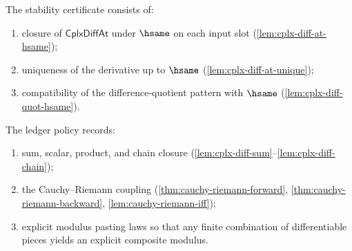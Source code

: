 \begin{definition}
\label{def:cplx-diff-stability-certificate}
The stability certificate consists of:
\begin{enumerate}
  \item closure of \(\mathsf{CplxDiffAt}\) under \(\hsame\) on each input slot (\autoref{lem:cplx-diff-at-hsame});
  \item uniqueness of the derivative up to \(\hsame\) (\autoref{lem:cplx-diff-at-unique});
  \item compatibility of the difference-quotient pattern with \(\hsame\) (\autoref{lem:cplx-diff-quot-hsame}).
\end{enumerate}
\end{definition}

\begin{definition}
\label{def:cplx-diff-ledger-policy}
The ledger policy records:
\begin{enumerate}
  \item sum, scalar, product, and chain closure (\autoref{lem:cplx-diff-sum}--\autoref{lem:cplx-diff-chain});
  \item the Cauchy--Riemann coupling (\autoref{thm:cauchy-riemann-forward}, \autoref{thm:cauchy-riemann-backward}, \autoref{lem:cauchy-riemann-iff});
  \item explicit modulus pasting laws so that any finite combination of differentiable pieces yields an explicit composite modulus.
\end{enumerate}
\end{definition}

